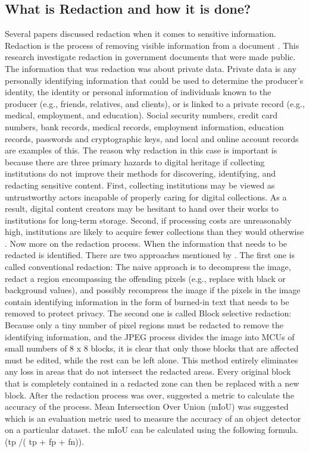 \documentclass[sigconf,authordraft]{acmart}
\begin{document}
\subsection{ What is Redaction and how it is done?}
Several papers discussed redaction when it comes to sensitive information. Redaction is the process of removing visible information from a document \cite{wir}. This research investigate redaction in government documents that were made public. The information that was redaction was about private data. Private data is any personally identifying information that could be used to determine the producer's identity, the identity or personal information of individuals known to the producer (e.g., friends, relatives, and clients), or is linked to a private record (e.g., medical, employment, and education). Social security numbers, credit card numbers, bank records, medical records, employment information, education records, passwords and cryptographic keys, and local and online account records are examples of this. The reason why redaction in this case is important is because there are three primary hazards to digital heritage if collecting institutions do not improve their methods for discovering, identifying, and redacting sensitive content. First, collecting institutions may be viewed as untrustworthy actors incapable of properly caring for digital collections. As a result, digital content creators may be hesitant to hand over their works to institutions for long-term storage. Second, if processing costs are unreasonably high, institutions are likely to acquire fewer collections than they would otherwise \cite{wirr}. Now more on the redaction process. When the information that needs to be redacted is identified. There are two approaches mentioned by \cite{reda}. The first one is called conventional redaction: The naive approach is to decompress the image, redact a region encompassing the offending pixels (e.g., replace with black or background values), and possibly recompress the image if the pixels in the image contain identifying information in the form of burned-in text that needs to be removed to protect privacy. The second one is called Block selective redaction: Because only a tiny number of pixel regions must be redacted to remove the identifying information, and the JPEG process divides the image into MCUs of small numbers of 8 x 8 blocks, it is clear that only those blocks that are affected must be edited, while the rest can be left alone. This method entirely eliminates any loss in areas that do not intersect the redacted areas. Every original block that is completely contained in a redacted zone can then be replaced with a new block. After the redaction process was over, \cite{how} suggested a metric to calculate the accuracy of the process. Mean Intersection Over Union (mIoU) was suggested which is an evaluation metric used to  measure the accuracy of an object detector on a particular dataset. the mIoU can be calculated using the following formula. \sum (tp /( tp + fp + fn)).
\end{document}
